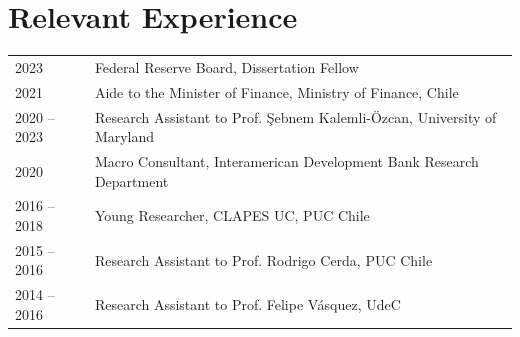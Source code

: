 \documentclass[10pt]{article}
\begin{document}

%
%
%





\section*{Relevant Experience}

\begin{tabular}{@{}p{1.8cm}p{13cm}}
    2023 & Federal Reserve Board, Dissertation Fellow\\
    2021 & Aide to the Minister of Finance, Ministry of Finance, Chile\\
    2020 -- 2023& Research Assistant to Prof. \c{S}ebnem Kalemli-\"{O}zcan, University of Maryland\\
    2020& Macro Consultant, Interamerican Development Bank Research Department\\
    2016 -- 2018& Young Researcher, CLAPES UC, PUC Chile\\
    2015 -- 2016& Research Assistant to Prof. Rodrigo Cerda, PUC Chile\\
    2014 -- 2016& Research Assistant to Prof. Felipe V\'asquez, UdeC
\end{tabular}
\end{document}
